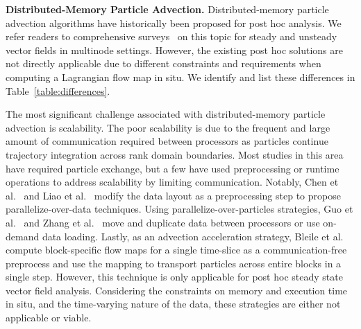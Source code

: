 \textbf{Distributed-Memory Particle Advection.}
%
Distributed-memory particle advection algorithms have historically been proposed for post hoc analysis.
%
We refer readers to comprehensive surveys~\cite{PeterkaRNLSKH11,zhang2018survey} on this topic for steady and unsteady vector fields in multinode settings.
%
However, the existing post hoc solutions are not directly applicable due to different constraints and requirements when computing a Lagrangian flow map in situ.
%
We identify and list these differences in Table~\ref{table:differences}.

The most significant challenge associated with distributed-memory particle advection is scalability.
%
The poor scalability is due to the frequent and large amount of communication required between processors as particles continue trajectory integration across rank domain boundaries.
%
Most studies in this area have required particle exchange, but a few have used preprocessing or runtime operations to address scalability by limiting communication.
%
Notably, Chen et al.~\cite{ChenXLS12, ChenS13} and Liao et al.~\cite{Liao2019ScalablePF} modify the data layout as a preprocessing step to propose parallelize-over-data techniques.
%
%
Using parallelize-over-particles strategies, Guo et al.~\cite{GuoHSZHY14} and Zhang et al.~\cite{ZhangGY16} move and duplicate data between processors or use on-demand data loading.
%
Lastly, as an advection acceleration strategy, Bleile et al.~\cite{bleile2017accelerating} compute block-specific flow maps for a single time-slice as a communication-free preprocess and use the mapping to transport particles across entire blocks in a single step. 
%
However, this technique is only applicable for post hoc steady state vector field analysis.
%
Considering the constraints on memory and execution time in situ, and the time-varying nature of the data, these strategies are either not applicable or viable. 
%
%


